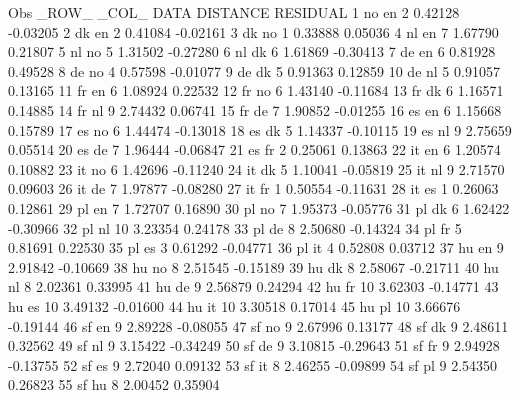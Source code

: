 \documentclass{article}
\begin{document}
\begin{Woutput}
Obs    _ROW_    _COL_    DATA    DISTANCE    RESIDUAL
  1     no       en        2      0.42128    -0.03205
  2     dk       en        2      0.41084    -0.02161
  3     dk       no        1      0.33888     0.05036
  4     nl       en        7      1.67790     0.21807
  5     nl       no        5      1.31502    -0.27280
  6     nl       dk        6      1.61869    -0.30413
  7     de       en        6      0.81928     0.49528
  8     de       no        4      0.57598    -0.01077
  9     de       dk        5      0.91363     0.12859
 10     de       nl        5      0.91057     0.13165
 11     fr       en        6      1.08924     0.22532
 12     fr       no        6      1.43140    -0.11684
 13     fr       dk        6      1.16571     0.14885
 14     fr       nl        9      2.74432     0.06741
 15     fr       de        7      1.90852    -0.01255
 16     es       en        6      1.15668     0.15789
 17     es       no        6      1.44474    -0.13018
 18     es       dk        5      1.14337    -0.10115
 19     es       nl        9      2.75659     0.05514
 20     es       de        7      1.96444    -0.06847
 21     es       fr        2      0.25061     0.13863
 22     it       en        6      1.20574     0.10882
 23     it       no        6      1.42696    -0.11240
 24     it       dk        5      1.10041    -0.05819
 25     it       nl        9      2.71570     0.09603
 26     it       de        7      1.97877    -0.08280
 27     it       fr        1      0.50554    -0.11631
 28     it       es        1      0.26063     0.12861
 29     pl       en        7      1.72707     0.16890
 30     pl       no        7      1.95373    -0.05776
 31     pl       dk        6      1.62422    -0.30966
 32     pl       nl       10      3.23354     0.24178
 33     pl       de        8      2.50680    -0.14324
 34     pl       fr        5      0.81691     0.22530
 35     pl       es        3      0.61292    -0.04771
 36     pl       it        4      0.52808     0.03712
 37     hu       en        9      2.91842    -0.10669
 38     hu       no        8      2.51545    -0.15189
 39     hu       dk        8      2.58067    -0.21711
 40     hu       nl        8      2.02361     0.33995
 41     hu       de        9      2.56879     0.24294
 42     hu       fr       10      3.62303    -0.14771
 43     hu       es       10      3.49132    -0.01600
 44     hu       it       10      3.30518     0.17014
 45     hu       pl       10      3.66676    -0.19144
 46     sf       en        9      2.89228    -0.08055
 47     sf       no        9      2.67996     0.13177
 48     sf       dk        9      2.48611     0.32562
 49     sf       nl        9      3.15422    -0.34249
 50     sf       de        9      3.10815    -0.29643
 51     sf       fr        9      2.94928    -0.13755
 52     sf       es        9      2.72040     0.09132
 53     sf       it        8      2.46255    -0.09899
 54     sf       pl        9      2.54350     0.26823
 55     sf       hu        8      2.00452     0.35904


\end{Woutput}
\end{document}

